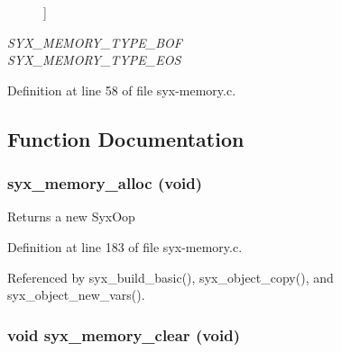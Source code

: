 \begin{Desc}
\begin{description}
{}]\item[{\em 
\hypertarget{syx-memory_8c_3c7c89c36d5970f74340ceffe8b582126981c2e1f08c487a2f9cf5df50019182}{
SYX\_\-MEMORY\_\-TYPE\_\-BOF}
\label{syx-memory_8c_3c7c89c36d5970f74340ceffe8b582126981c2e1f08c487a2f9cf5df50019182}
}]\item[{\em 
\hypertarget{syx-memory_8c_3c7c89c36d5970f74340ceffe8b5821298093ab7fdeac562eda67bcf508c8635}{
SYX\_\-MEMORY\_\-TYPE\_\-EOS}
\label{syx-memory_8c_3c7c89c36d5970f74340ceffe8b5821298093ab7fdeac562eda67bcf508c8635}
}]\end{description}
\end{Desc}



Definition at line 58 of file syx-memory.c.

\subsection{Function Documentation}
\hypertarget{syx-memory_8c_bcaea59428ce48c03c68b1058a089fb2}{
\subsubsection{ syx\_\-memory\_\-alloc (void)}}
\label{syx-memory_8c_bcaea59428ce48c03c68b1058a089fb2}


Returns a new SyxOop 

Definition at line 183 of file syx-memory.c.

Referenced by syx\_\-build\_\-basic(), syx\_\-object\_\-copy(), and syx\_\-object\_\-new\_\-vars().\hypertarget{syx-memory_8c_a035cb5cf9b570cb6584d6cd4aafe512}{
\subsubsection{\setlength{\rightskip}{0pt plus 5cm}void syx\_\-memory\_\-clear (void)}}
\label{syx-memory_8c_a035cb5cf9b570cb6584d6cd4aafe512}


